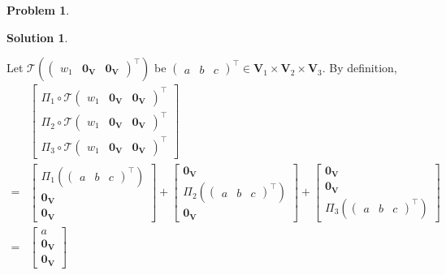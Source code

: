 \documentclass{book}
\theoremstyle{definition}
\newtheorem*{prob*}{Problem}
\newtheorem*{sln*}{Solution}
\newcommand{\V}{\mathbf{V}}
\newcommand{\T}{\mathcal{T}}
\begin{document}
\begin{prob*}
\begin{sln*}
\begin{enumerate}
\begin{enumerate}
			Let $\T\left(\begin{pmatrix}
			w_1&\mathbf{0}_\V&\mathbf{0}_\V
			\end{pmatrix}^\top\right)$ be $\begin{pmatrix}
			a&b&c
			\end{pmatrix}^\top\in \V_1\times\V_2\times\V_3$. By definition,
			\begin{align*}
			&\begin{bmatrix}
			\Pi_1 \circ \T\begin{pmatrix} w_1 & \mathbf{0}_\V & \mathbf{0}_\V \end{pmatrix}^\top\\
			\Pi_2 \circ \T\begin{pmatrix} w_1 & \mathbf{0}_\V & \mathbf{0}_\V \end{pmatrix}^\top\\
			\Pi_3 \circ \T\begin{pmatrix} w_1 & \mathbf{0}_\V & \mathbf{0}_\V \end{pmatrix}^\top
			\end{bmatrix}\\ =
			&\begin{bmatrix}
			\Pi_1 \left(\begin{pmatrix}
			a&b&c
			\end{pmatrix}^\top\right)\\
			\mathbf{0}_\V\\
			\mathbf{0}_\V
			\end{bmatrix} +
			 \begin{bmatrix}
			 \mathbf{0}_\V\\
			 \Pi_2 \left(\begin{pmatrix}
			 a&b&c
			 \end{pmatrix}^\top\right)\\
			 \mathbf{0}_\V
			 \end{bmatrix} + 
			 \begin{bmatrix}
			 \mathbf{0}_\V\\
			 \mathbf{0}_\V\\
			 \Pi_3 \left(\begin{pmatrix}
			 a&b&c
			 \end{pmatrix}^\top\right)
			 \end{bmatrix}\\
			 =
			 &\begin{bmatrix}
			 a\\
			 \mathbf{0}_\V\\
			 \mathbf{0}_\V
			 \end{bmatrix} 

\end{align*}
\end{enumerate}
\end{enumerate}
\end{sln*}
\end{prob*}
\end{document}
